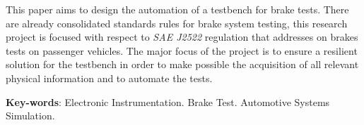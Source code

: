 \begin{resumo}
This paper aims to design the automation of a testbench for brake tests. There are already consolidated standards rules for brake system testing, this research project is focused with respect to \textit{SAE J2522} regulation  that addresses on brakes tests on passenger vehicles. The major focus of the project is to ensure a resilient solution for the testbench in order to make possible the acquisition of all relevant physical information and to automate the tests.


 \vspace{\onelineskip}
    
 \noindent
   \textbf{Key-words}: Electronic Instrumentation. Brake Test. Automotive Systems Simulation.
\end{resumo}
